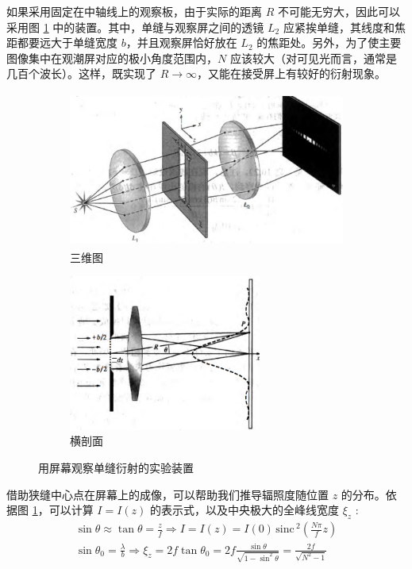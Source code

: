 \documentclass[UTF8]{report}
\def\sinc{\mathrm{\,sinc}\,}
\theoremstyle{MyLineTheoremStyle} %
\theoremstyle{MyBlockTheoremStyle} %
\theoremstyle{MySubsubsectionStyle} %
\begin{document}
如果采用固定在中轴线上的观察板，由于实际的距离 $R$ 不可能无穷大，因此可以采用图 \ref{用屏幕观察单缝衍射的实验装置} 中的装置。其中，单缝与观察屏之间的透镜 $L_2$ 应紧挨单缝，其线度和焦距都要远大于单缝宽度 $b$，并且观察屏恰好放在 $L_2$ 的焦距处。另外，为了使主要图像集中在观潮屏对应的极小角度范围内，$N$ 应该较大（对可见光而言，通常是几百个波长）。这样，既实现了 $R \to \infty$，又能在接受屏上有较好的衍射现象。

\begin{figure}[H]\centering
\begin{subfigure}[b]{0.57\columnwidth}\centering
    \includegraphics[height=145pt]{assets/4/4.3 辐照度位置仪2.jpg}
    \caption{三维图}
\end{subfigure}\hfill
\begin{subfigure}[b]{0.36\columnwidth}\centering
    \includegraphics[height=145pt]{assets/4/4.3 辐照度位置仪.png}
    \caption{横剖面}
\end{subfigure}
\caption{用屏幕观察单缝衍射的实验装置}
\label{用屏幕观察单缝衍射的实验装置}
\end{figure}

借助狭缝中心点在屏幕上的成像，可以帮助我们推导辐照度随位置 $z$ 的分布。依据图 \ref{用屏幕观察单缝衍射的实验装置}，可以计算 $I = I(z)$ 的表示式，以及中央极大的全峰线宽度 $\xi_z$ : 
\begin{gather}
    \sin \theta \approx \tan \theta = \frac{z}{f} \Longrightarrow I = I(z) = I(0) \sinc^2 \left( \frac{N \pi}{f} z\right) \\ 
    \sin \theta_0 = \frac{\lambda}{b} \Longrightarrow \xi_z = 2 f \tan \theta_0 = 2f\frac{\sin \theta}{\sqrt{1 - \sin^2 \theta}} = \frac{2f}{\sqrt{N^2 - 1}}
\end{gather}
\end{document}
